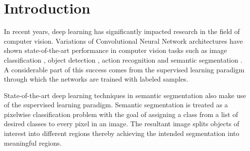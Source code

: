 
\chapter{Introduction}

In recent years, deep learning has significantly impacted research in the field of computer vision. Variations of Convolutional Neural Network architectures have shown state-of-the-art performance in computer vision tasks such as image classification \cite{DBLP:journals/corr/HeZRS15}, object detection \cite{DBLP:journals/corr/RedmonDGF15}, action recognition \cite{DBLP:journals/corr/SimonyanZ14} and semantic segmentation \cite{DBLP:journals/corr/abs-1802-02611}. A considerable part of this success comes from the supervised learning paradigm through which the networks are trained with labeled samples.

State-of-the-art deep learning techniques in semantic segmentation also make use of the supervised learning paradigm. Semantic segmentation is treated as a pixelwise classification problem with the goal of assigning a class from a list of desired classes to every pixel in an image. The resultant image splits objects of interest into different regions thereby achieving the intended segmentation into meaningful regions.


